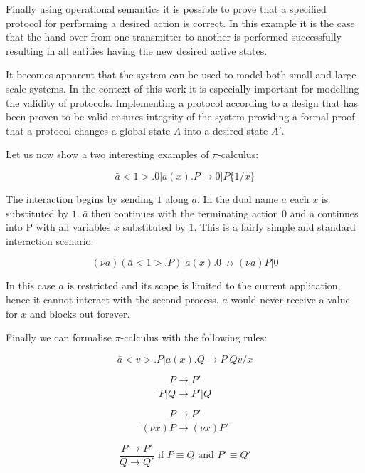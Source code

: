 Finally using operational semantics it is possible to prove that a specified protocol for performing a desired action is correct. In this example it is the case that the hand-over from one transmitter to another is performed successfully resulting in all entities having the new desired active states.

It becomes apparent that the system can be used to model both small and large scale systems. In the context of this work it is especially important for modelling the validity of protocols. Implementing a protocol according to a design that has been proven to be valid ensures integrity of the system providing a formal proof that a protocol changes a global state $A$ into a desired state $A'$.

Let us now show a two interesting examples of $\pi$-calculus:

$$ \bar{a}<1>.0 | a(x).P \longrightarrow 0 | P\{1/x\} $$

The interaction begins by sending $1$ along $\bar{a}$. In the dual name $a$ each $x$ is substituted by $1$. $\bar{a}$ then continues with the terminating action $0$ and a continues into P with all variables $x$ substituted by $1$. This is a fairly simple and standard interaction scenario.

$$ (\nu a)(\bar{a}<1>.P) | a(x).0 \nrightarrow (\nu a) P|0 $$

In this case $a$ is restricted and its scope is limited to the current application, hence it cannot interact with the second process. $a$ would never receive a value for $x$ and blocks out forever.

Finally we can formalise ${\pi}$-calculus with the following rules:

\begin{equation} \bar{a}<v>.P | a(x).Q \longrightarrow P|Q{v/x} \end{equation}

\begin{equation} \frac{P \rightarrow P'}{P|Q \rightarrow P'|Q} \end{equation}

\begin{equation} \frac{P \rightarrow P'}{(\nu x) P \rightarrow (\nu x) P'} \end{equation}

\begin{equation} \frac{P \rightarrow P'}{Q \rightarrow Q'} \mbox{ if } P \equiv Q \mbox{ and } P' \equiv Q' \end{equation}
\newline


